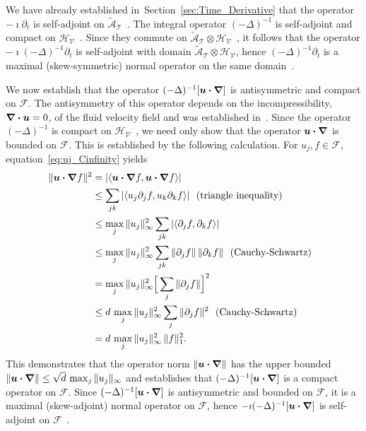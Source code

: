 \documentclass[leqno,onefignum,onetabnum]{siamltex1213}
\newcommand{\secref}[1]{Section~\ref{#1}}
\newcommand{\Tc}{\mathcal{T}}
\newcommand{\Vc}{\mathcal{V}}
\newcommand{\Hs}{\mathscr{H}}
\newcommand{\As}{\mathscr{A}}
\newcommand{\Fs}{\mathscr{F}}
\newcommand\bnabla{\mbox{\boldmath${\nabla}$}}
\providecommand\bcdot{\boldsymbol{\cdot}}
\newcommand{\vecu}{\boldsymbol{u}}
\begin{document}
We have already established in~\secref{sec:Time_Derivative} that the
operator $-\imath\partial_t$ is self-adjoint on
$\tilde{\As}_{\Tc}$~\cite{Stone:64}. The integral operator $(-\Delta)^{-1}$
is self-adjoint and compact on
$\Hs_{\Vc}$~\cite{Stakgold:BVP:2000}. Since they commute on
$\tilde{\As}_{\Tc}\otimes\Hs_{\Vc}$~\cite{Folland:99:RealAnalysis}, it 
follows that the operator $-\imath(-\Delta)^{-1}\partial_t$ is self-adjoint with domain
$\tilde{\As}_{\Tc}\otimes\Hs_{\Vc}$, hence $(-\Delta)^{-1}\partial_t$ is a maximal
(skew-symmetric) normal operator on the same domain~\cite{Stone:64}.




We now establish that the operator $(-\Delta)^{-1}[\vecu\bcdot\bnabla]$
is antisymmetric and compact on $\Fs$. The antisymmetry of this
operator depends on the incompressibility, $\bnabla\bcdot\vecu=0$, of
the fluid velocity field and was established
in~\cite{Bhattacharya:AAP:1999:951,Pavliotis:PHD_Thesis}. 
Since the operator $(-\Delta)^{-1}$ is compact on
$\Hs_{\Vc}$~\cite{Stakgold:BVP:2000}, we need only show that the
operator $\vecu\bcdot\bnabla$ is bounded on $\Fs$. This is established
by the following calculation. For $u_j,f\in\Fs$,
equation~\eqref{eq:uj_Cinfinity}  yields 
%
\begin{align}\label{eq:Second_Bound_A}
  \|\vecu\bcdot\bnabla f\|^2&=|\langle\vecu\bcdot\bnabla f,\vecu\bcdot\bnabla f\rangle| 
         \\
         &\leq\sum_{jk}|\langle u_j\partial_jf,u_k\partial_kf\rangle |~\text{ (triangle inequality) }
         \notag\\
         &\leq\max_j\|u_j\|_\infty^2\sum_{jk}|\langle\partial_jf,\partial_kf\rangle|
         \notag\\
         &\leq\max_j\|u_j\|_\infty^2\sum_{jk}\|\partial_jf\|\,\|\partial_kf\|
              ~\text{ (Cauchy-Schwartz) }~
         \notag\\
         &=\max_j\|u_j\|_\infty^2\Big[\sum_{j}\|\partial_jf\|\Big]^2
         \notag\\
         &\leq d\,\max_j\|u_j\|_\infty^2\sum_{j}\|\partial_jf\|^2
         ~\text{ (Cauchy-Schwartz) }~
         \notag\\
         &=d\,\max_j\|u_j\|_\infty^2\,\|f\|_1^2.
         \notag
\end{align}
%
This demonstrates that the operator norm $\|\vecu\bcdot\bnabla\|$ has
the upper bounded $\|\vecu\bcdot\bnabla\|\leq\sqrt{d}\,\max_j\|u_j\|_\infty$ and
establishes that $(-\Delta)^{-1}[\vecu\bcdot\bnabla]$ is a compact operator
on $\Fs$. Since $(-\Delta)^{-1}[\vecu\bcdot\bnabla]$ is
antisymmetric and bounded on $\Fs$, it is a maximal (skew-adjoint)
normal operator on $\Fs$, hence $-\imath(-\Delta)^{-1}[\vecu\bcdot\bnabla]$ is
self-adjoint on $\Fs$~\cite{Stone:64}. 
\end{document}
